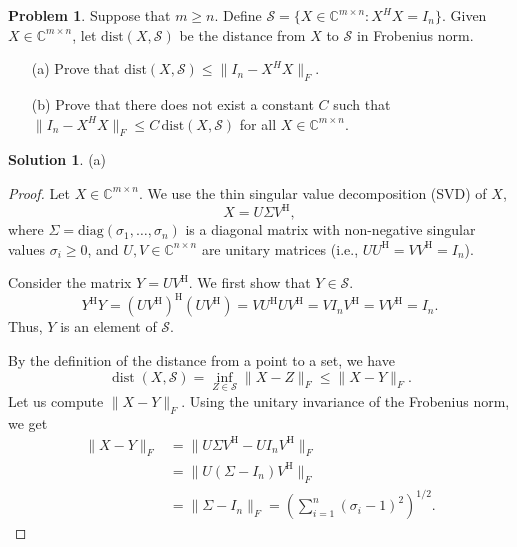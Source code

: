 \documentclass[12pt]{article}
\theoremstyle{definition}
\newtheorem*{solution}{\normalfont\textbf{Solution}}
\newtheorem*{Problem}{\noindent\textbf{Problem}}
\DeclareMathOperator{\dist}{dist}
\begin{document}
\begin{enumerate}[leftmargin=*]
    \item \begin{Problem}
            Suppose that \( m \geq n \). Define \( \mathcal{S} = \{ X \in \mathbb{C}^{m \times n} : X^H X = I_n \} \). Given \( X \in \mathbb{C}^{m \times n} \), let \( \text{dist}(X, \mathcal{S}) \) be the distance from \( X \) to \( \mathcal{S} \) in Frobenius norm.
            \begin{enumerate}
                \item[(a)] Prove that \( \text{dist}(X, \mathcal{S}) \leq \| I_n - X^H X \|_F \).
                \item[(b)] Prove that there does not exist a constant \( C \) such that \( \| I_n - X^H X \|_F \leq C \, \text{dist}(X, \mathcal{S}) \) for all \( X \in \mathbb{C}^{m \times n} \).
            \end{enumerate}
        \end{Problem}
        \begin{solution}
        \item[(a)]
            \begin{proof}
            Let \( X \in \mathbb{C}^{m \times n} \). We use the thin singular value decomposition (SVD) of \(X\),
            \[ X = U \Sigma V^{\mathrm{H}}, \]
            where \( \Sigma = \mathrm{diag}(\sigma_1, \dots, \sigma_n) \) 
            is a diagonal matrix with non-negative singular values \( \sigma_i \geq 0 \), and \( U, V \in \mathbb{C}^{n \times n} \) are  unitary matrices (i.e., \( UU^{\mathrm{H}} = VV^{\mathrm{H}} = I_{n} \)).

            Consider the matrix \( Y = UV^{\mathrm{H}} \). We first show that \( Y \in \mathcal{S} \).
            \[ Y^{\mathrm{H}}Y = (UV^{\mathrm{H}})^{\mathrm{H}}(UV^{\mathrm{H}}) = V U^{\mathrm{H}} U V^{\mathrm{H}} = V I_{n} V^{\mathrm{H}} = VV^{\mathrm{H}} = I_{n}. \]
            Thus, \( Y \) is an element of \( \mathcal{S} \).

            By the definition of the distance from a point to a set, we have
            \[ \dist(X, \mathcal{S}) = \inf_{Z \in \mathcal{S}} \| X-Z \|_F \leq \| X-Y \|_F. \]
            Let us compute \( \| X-Y \|_F \). Using the unitary invariance of the Frobenius norm, we get
            \begin{align*}
                \| X-Y \|_F &= \| U \Sigma V^{\mathrm{H}} - U I_{n} V^{\mathrm{H}} \|_F \\
                &= \| U (\Sigma - I_{n}) V^{\mathrm{H}} \|_F \\
                &= \| \Sigma - I_{n} \|_F = \left( \sum_{i=1}^n (\sigma_i - 1)^2 \right)^{1/2}.
            \end{align*}


\end{proof}
\end{solution}
\end{enumerate}
\end{document}
